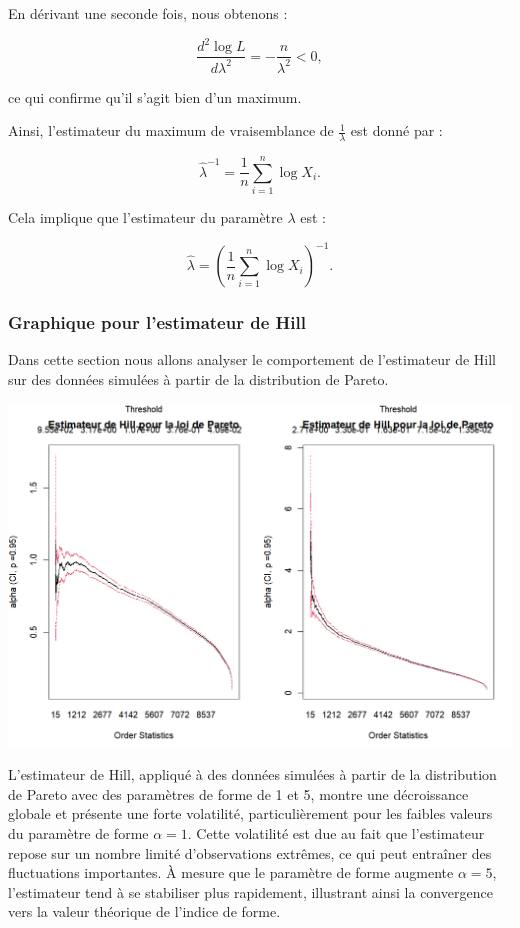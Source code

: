 \documentclass{article}
\begin{document}
En dérivant une seconde fois, nous obtenons :

\[
\frac{d^2 \log L}{d \lambda^2} = -\frac{n}{\lambda^2} < 0,
\]

ce qui confirme qu'il s'agit bien d'un maximum.  

Ainsi, l'estimateur du maximum de vraisemblance de \( \frac{1}{\lambda} \) est donné par :

\[
\hat{\lambda}^{-1} = \frac{1}{n} \sum_{i=1}^{n} \log X_i.
\]

Cela implique que l'estimateur du paramètre \( \lambda \) est :

\[
\hat{\lambda} = \left( \frac{1}{n} \sum_{i=1}^{n} \log X_i \right)^{-1}.
\]
\subsubsection{Graphique pour l'estimateur de Hill}
Dans cette section nous allons analyser le comportement de l'estimateur de Hill sur des données simulées à partir de la distribution de Pareto.
\begin{center}
	\includegraphics[scale=0.6]{./Codes_R/estimateur_hill_pareto.png} 
\end{center}
L'estimateur de Hill, appliqué à des données simulées à partir de la distribution de Pareto avec des paramètres de forme de 1 et 5, montre une décroissance globale et présente une forte volatilité, particulièrement pour les faibles valeurs du paramètre de forme \(\alpha = 1\). Cette volatilité est due au fait que l'estimateur repose sur un nombre limité d'observations extrêmes, ce qui peut entraîner des fluctuations importantes. À mesure que le paramètre de forme augmente \(\alpha = 5\), l'estimateur tend à se stabiliser plus rapidement, illustrant ainsi la convergence vers la valeur théorique de l'indice de forme.
\end{document}
